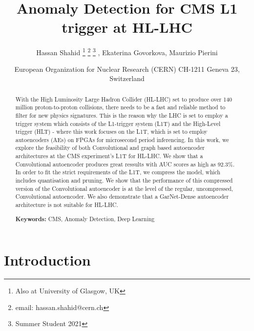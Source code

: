 \documentclass[a4paper]{article}
\title{Anomaly Detection for CMS L1 trigger at HL-LHC}
\author{Hassan Shahid \thanks{Also at University of Glasgow, UK} \thanks{email: hassan.shahid@cern.ch} \thanks{Summer Student 2021} , Ekaterina Govorkova, Maurizio Pierini}
\date{
	\small European Organization for Nuclear Research (CERN) CH-1211 Geneva 23, Switzerland \\%
}
\theoremstyle{plain}
\theoremstyle{definition}
\begin{document}
	\maketitle
	
	\begin{abstract}
		
		With the High Luminosity Large Hadron Collider (HL-LHC) set to produce over 140 million proton-to-proton collisions, there needs to be a fast and reliable method to filter for new physics signatures. This is the reason why the LHC is set to employ a trigger system which consists of the L1-trigger system (L1T) and the High-Level trigger (HLT) - where this work focuses on the L1T, which is set to employ autoencoders (AEs) on FPGAs for microsecond period inferencing. In this work, we explore the feasibility of both Convolutional and graph based autoencoder architectures at the CMS experiment's L1T for HL-LHC. We show that a Convolutional autoencoder produces great ressults with AUC scores as high as 92.3\%. In order to fit the strict requirements of the L1T, we compress the model, which includes quantisation and pruning. We show that the performance of this compressed version of the Convolutional autoencoder is at the level of the regular, uncompressed, Convolutional autoencoder. We also demonstrate that a GarNet-Dense autoencoder architecture is not suitable for HL-LHC. 
		
		\noindent\textbf{Keywords:} CMS, Anomaly Detection, Deep Learning
	\end{abstract}
	
	\clearpage

	\tableofcontents
	
	\clearpage
	
	\section{Introduction}
	\label{sec:intro}
	
\end{document}
